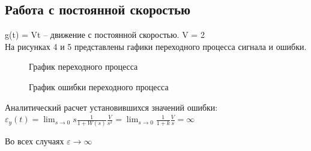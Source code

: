 \documentclass[a4paper, 11pt]{article}
\begin{document}
\subsection{Работа с постоянной скоростью} g(t) = Vt – движение с постоянной скоростью. V = 2\\На рисунках 4 и 5 представлены гафики переходного процесса сигнала и ошибки.


\begin{figure}[h!]
    \caption{График переходного процесса}
    \label{four}
\end{figure}
\begin{figure}[h!]
    \caption{График ошибки переходного процесса}
    \label{tree}
\end{figure}

Аналитический расчет установившихся значений ошибки:\\
$\varepsilon_y(t)=\lim_{s\to0}s\frac{1}{1+W(s)}\frac{V}{s^2}=\lim_{s\to0}\frac{1}{1+k}\frac{V}{s}=\infty$

Во всех случаях $\varepsilon\to\infty$ 

\newpage
\end{document}
